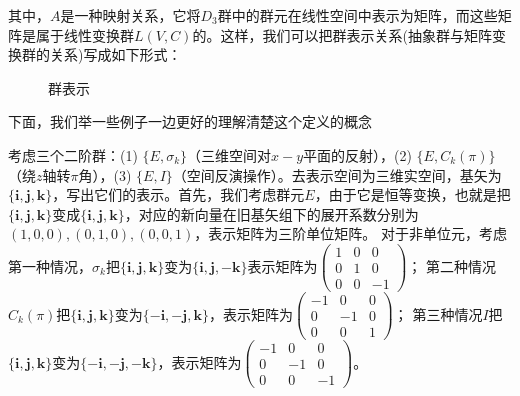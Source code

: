 其中，$A$是一种映射关系，它将$D_3$群中的群元在线性空间中表示为矩阵，而这些矩阵是属于线性变换群$L(V,C)$的。这样，我们可以把群表示关系(抽象群与矩阵变换群的关系)写成如下形式：
\begin{figure}[htbp]
	\centering
	\caption{群表示}
\end{figure}
\newline
下面，我们举一些例子一边更好的理解清楚这个定义的概念
\begin{example}
	考虑三个二阶群：(1) $\{E, \sigma_k\}$（三维空间对$x-y$平面的反射），(2) $\{E, C_k(\pi)\}$（绕$z$轴转$\pi$角），(3) $\{E, I\}$（空间反演操作）。去表示空间为三维实空间，基矢为$\{\bm{i}, \bm{j}, \bm{k}\}$，写出它们的表示。首先，我们考虑群元$E$，由于它是恒等变换，也就是把$\{\bm{i}, \bm{j}, \bm{k}\}$变成$\{\bm{i}, \bm{j}, \bm{k}\}$，对应的新向量在旧基矢组下的展开系数分别为$(1, 0, 0), (0, 1, 0), (0, 0, 1)$，表示矩阵为三阶单位矩阵。
	\newline
	对于非单位元，考虑第一种情况，$\sigma_k$把$\{\bm{i}, \bm{j}, \bm{k}\}$变为$\{\bm{i}, \bm{j}, -\bm{k}\}$表示矩阵为$ \begin{pmatrix}
		1	&	0	&	0	\\
		0	&	1	&	0	\\
		0	&	0	&	-1
	\end{pmatrix}$；
	\newline
	第二种情况$C_k(\pi)$把$\{\bm{i}, \bm{j}, \bm{k}\}$变为$\{-\bm{i}, -\bm{j}, \bm{k}\}$，表示矩阵为$ \begin{pmatrix}
		-1	&	0	&	0	\\
		0	&	-1	&	0	\\
		0	&	0	&	1
	\end{pmatrix}$；
	\newline
	第三种情况$I$把$\{\bm{i}, \bm{j}, \bm{k}\}$变为$\{-\bm{i}, -\bm{j}, -\bm{k}\}$，表示矩阵为$ \begin{pmatrix}
		-1	&	0	&	0	\\
		0	&	-1	&	0	\\
		0	&	0	&	-1
	\end{pmatrix}$。
\end{example}

